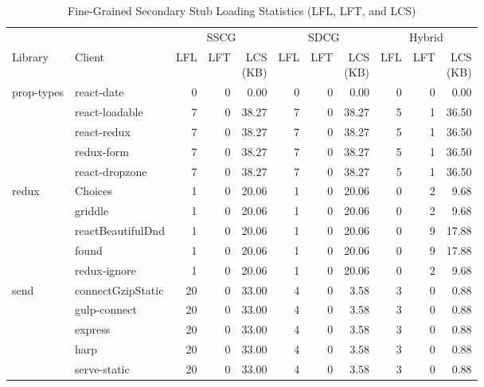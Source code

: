 \begin{table}[htbp]
\centering
\caption{Fine-Grained Secondary Stub Loading Statistics (LFL, LFT, and LCS)}
\label{tab:stub_stats}
\footnotesize
\setlength{\tabcolsep}{2.6pt}
\renewcommand{\arraystretch}{1.10}
\begin{tabular*}{1.0\linewidth}{@{\extracolsep{\fill}}llrrrrrrrrr@{}}
\toprule
& & \multicolumn{3}{c}{SSCG} & \multicolumn{3}{c}{SDCG} & \multicolumn{3}{c}{Hybrid} \\
\cmidrule(lr){3-5}\cmidrule(lr){6-8}\cmidrule(l){9-11}
Library & Client & LFL & LFT & \makecell[r]{LCS\\(KB)} & LFL & LFT & \makecell[r]{LCS\\(KB)} & LFL & LFT & \makecell[r]{LCS\\(KB)} \\
\midrule
prop-types & react-date & 0 & 0 & 0.00 & 0 & 0 & 0.00 & 0 & 0 & 0.00 \\
 & react-loadable & 7 & 0 & 38.27 & 7 & 0 & 38.27 & 5 & 1 & 36.50 \\
 & react-redux & 7 & 0 & 38.27 & 7 & 0 & 38.27 & 5 & 1 & 36.50 \\
 & redux-form & 7 & 0 & 38.27 & 7 & 0 & 38.27 & 5 & 1 & 36.50 \\
 & react-dropzone & 7 & 0 & 38.27 & 7 & 0 & 38.27 & 5 & 1 & 36.50 \\
\addlinespace[4pt]
redux & Choices & 1 & 0 & 20.06 & 1 & 0 & 20.06 & 0 & 2 & 9.68 \\
 & griddle & 1 & 0 & 20.06 & 1 & 0 & 20.06 & 0 & 2 & 9.68 \\
 & reactBeautifulDnd & 1 & 0 & 20.06 & 1 & 0 & 20.06 & 0 & 9 & 17.88 \\
 & found & 1 & 0 & 20.06 & 1 & 0 & 20.06 & 0 & 9 & 17.88 \\
 & redux-ignore & 1 & 0 & 20.06 & 1 & 0 & 20.06 & 0 & 2 & 9.68 \\
\addlinespace[4pt]
send & connectGzipStatic & 20 & 0 & 33.00 & 4 & 0 & 3.58 & 3 & 0 & 0.88 \\
 & gulp-connect & 20 & 0 & 33.00 & 4 & 0 & 3.58 & 3 & 0 & 0.88 \\
 & express & 20 & 0 & 33.00 & 4 & 0 & 3.58 & 3 & 0 & 0.88 \\
 & harp & 20 & 0 & 33.00 & 4 & 0 & 3.58 & 3 & 0 & 0.88 \\
 & serve-static & 20 & 0 & 33.00 & 4 & 0 & 3.58 & 3 & 0 & 0.88 \\
\bottomrule
\end{tabular*}
\end{table}
